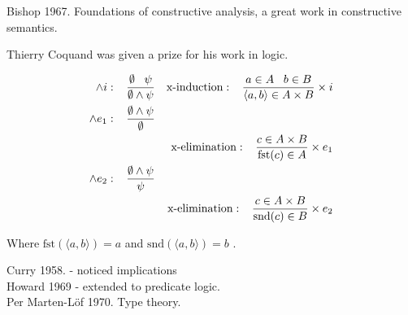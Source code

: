 \documentclass[12pt]{report}
\begin{document}
Bishop 1967. Foundations of constructive analysis, a great work in constructive
semantics.

Thierry Coquand was given a prize for his work in logic.



\begin{align*}
  \wedge i: \;\;\; \frac{\emptyset \;\;\; \psi}{\emptyset \wedge \psi} 
    && \text{x-induction}: \;\;\; \frac{a \in A \;\;\; b \in B}{\langle a,b \rangle \in A \times B} \times i\\
\wedge e_1: \;\;\; \frac{\emptyset \wedge \psi}{\emptyset} \\
&& \text{x-elimination}: \;\;\; \frac{c \in A \times B}{ \text{fst}(c) \in A} \times e_1\\
\wedge e_2: \;\;\; \frac{\emptyset \wedge \psi}{\psi} \\
&& \text{x-elimination}: \;\;\; \frac{c \in A \times B}{ \text{snd}(c) \in B} \times e_2
\end{align*}

Where
 $\text{fst}(\langle  a, b \rangle) = a$  and
 $\text{snd}(\langle  a, b \rangle) = b$ .

Curry 1958. - noticed implications\\
Howard 1969 - extended to predicate logic.\\
Per Marten-Löf 1970. Type theory.
\end{document}
